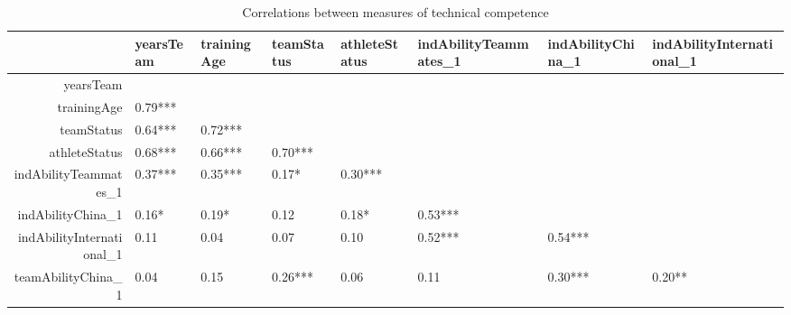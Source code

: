 \begin{table}[ht]
\centering
\begin{tabular}{rlllllll}
  \hline
 & yearsTeam & trainingAge & teamStatus & athleteStatus & indAbilityTeammates\_1 & indAbilityChina\_1 & indAbilityInternational\_1 \\ 
  \hline
yearsTeam &  &  &  &  &  &  &  \\ 
  trainingAge &  0.79*** &  &  &  &  &  &  \\ 
  teamStatus &  0.64*** &  0.72*** &  &  &  &  &  \\ 
  athleteStatus &  0.68*** &  0.66*** &  0.70*** &  &  &  &  \\ 
  indAbilityTeammates\_1 &  0.37*** &  0.35*** &  0.17*  &  0.30*** &  &  &  \\ 
  indAbilityChina\_1 &  0.16*  &  0.19*  &  0.12  &  0.18*  &  0.53*** &  &  \\ 
  indAbilityInternational\_1 &  0.11  &  0.04  &  0.07  &  0.10  &  0.52*** &  0.54*** &  \\ 
  teamAbilityChina\_1 &  0.04  &  0.15  &  0.26*** &  0.06  &  0.11  &  0.30*** &  0.20**  \\ 
   \hline
\end{tabular}
\caption{Correlations between measures of technical competence} 
\label{tab:technicalCompetenceCorrTable}
\end{table}
